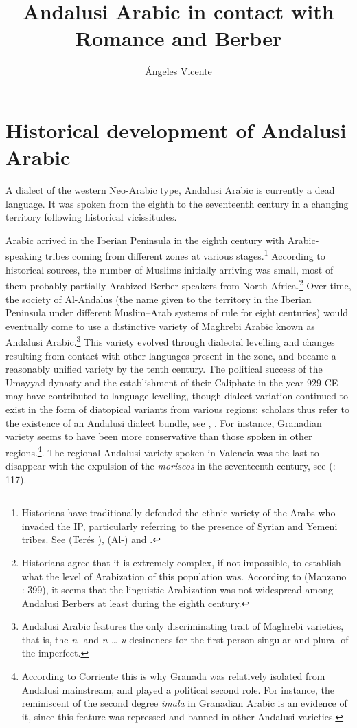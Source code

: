 \documentclass[output=paper,modfonts,nonflat]{langsci/langscibook}
\author{Ángeles Vicente \affiliation{University of Zaragoza}}
\title{Andalusi Arabic in contact with Romance and Berber}
\begin{document}
\maketitle 




\section{Historical development of Andalusi Arabic}


A dialect of the western Neo-Arabic type, Andalusi Arabic is currently a dead language. It was spoken from the eighth to the seventeenth century in a changing territory following historical vicissitudes. 

Arabic arrived in the Iberian Peninsula in the eighth century with Arabic-speaking tribes coming from different zones at various stages.\footnote{Historians have traditionally defended the ethnic variety of the Arabs who invaded the IP, particularly referring to the presence of Syrian and Yemeni tribes. See (Terés \citealt{Sádaba1957}), (Al-\citealt{Wasif1990}) and \citep{Guichard1995}.} According to historical sources, the number of Muslims initially arriving was small, most of them probably partially Arabized Berber-speakers from North Africa.\footnote{Historians agree that it is extremely complex, if not impossible, to establish what the level of Arabization of this population was. According to (Manzano \citealt{Moreno1990}: 399), {it seems that the linguistic Arabization was not widespread among Andalusi Berbers at least during the eighth century.}} Over time, the society of Al-Andalus (the name given to the territory in the Iberian Peninsula under different Muslim–Arab systems of rule for eight centuries) would eventually come to use a distinctive variety of Maghrebi Arabic known as Andalusi Arabic.\footnote{Andalusi Arabic features the only discriminating trait of Maghrebi varieties, that is, the \textit{n}{}- and \textit{n-…-u} desinences for the first person singular and plural of the imperfect.}  This variety evolved through dialectal levelling and changes resulting from contact with other languages present in the zone, and became a reasonably unified variety by the tenth century. The political success of the Umayyad dynasty and the establishment of their Caliphate in the year 929 CE may have contributed to language levelling, though dialect variation continued to exist in the form of diatopical variants from various regions; scholars thus refer to the existence of an Andalusi dialect bundle, see \citep[6]{Corriente1977}, \citep[446]{Corriente1992}. For instance, Granadian variety seems to have been more conservative than those spoken in other regions.\footnote{According to Corriente \citep[56]{Corriente1998a} this is why Granada was relatively isolated from Andalusi mainstream, and played a political second role. For instance, the reminiscent of the second degree \textit{imala} in Granadian Arabic is an evidence of it, since this feature was repressed and banned in other Andalusi varieties.}. The regional Andalusi variety spoken in Valencia was the last to disappear with the expulsion of the \textit{moriscos} in the seventeenth century, see (\citealt{BarcelóLabarta2009}: 117).
\end{document}

